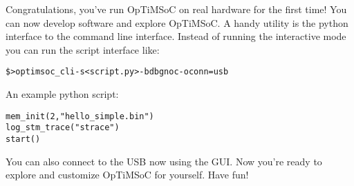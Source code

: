 Congratulations, you've run OpTiMSoC on real hardware for the first
time! You can now develop software and explore OpTiMSoC. A handy
utility is the python interface to the command line interface. Instead
of running the interactive mode you can run the script interface like:

\begin{alltt}
\$> optimsoc_cli -s <script.py> -bdbgnoc -oconn=usb
\end{alltt}

An example python script:

\begin{alltt}
mem_init(2,"hello_simple.bin")
log_stm_trace("strace")
start()
\end{alltt}

You can also connect to the USB now using the GUI. Now you're ready to
explore and customize OpTiMSoC for yourself. Have fun!
